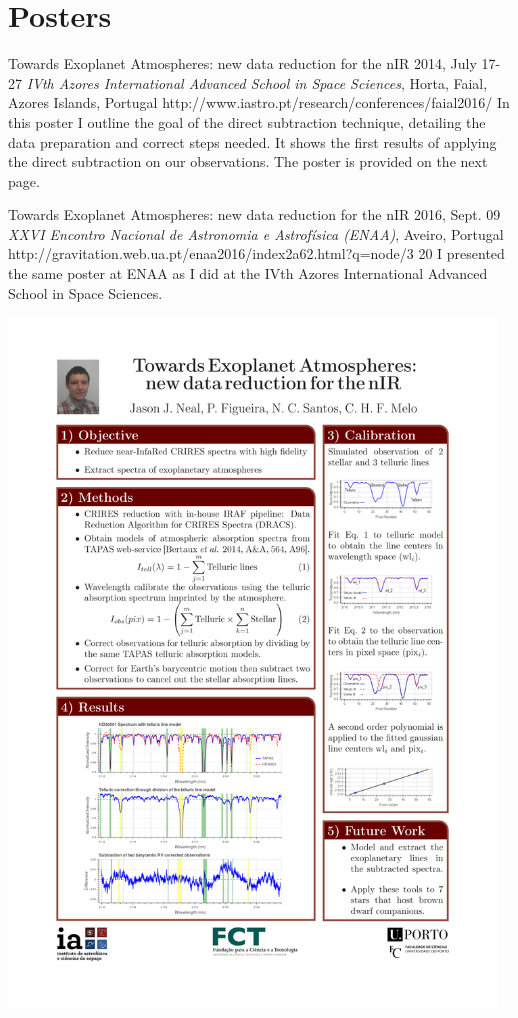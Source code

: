 \section{Posters}


 {Towards Exoplanet Atmospheres: new data reduction for the nIR}%
{2014, July 17-27}%
{\textit{IVth Azores International Advanced School in Space Sciences}, Horta, Faial, Azores Islands, Portugal}%
{http://www.iastro.pt/research/conferences/faial2016/}%
{}%
{In this poster I outline the goal of the direct subtraction technique, detailing the data preparation and correct steps needed. It shows the first results of applying the direct subtraction on our observations. The poster is provided on the next page.}%


 {Towards Exoplanet Atmospheres: new data reduction for the nIR}%
{2016, Sept. 09}%
{\textit{XXVI Encontro Nacional de Astronomia e Astrofísica (ENAA)}, Aveiro, Portugal}%
{ http://gravitation.web.ua.pt/enaa2016/index2a62.html?q=node/3}%
{20}%
{I presented the same poster at ENAA as I did at the IVth Azores International Advanced School in Space Sciences.}

{\centering \includegraphics[width=0.97\textwidth,keepaspectratio=true,page = 1, trim = 1.5cm 1cm 1.5cm 1cm, clip = true]{appendices/papers/Azores2016_Final}}
